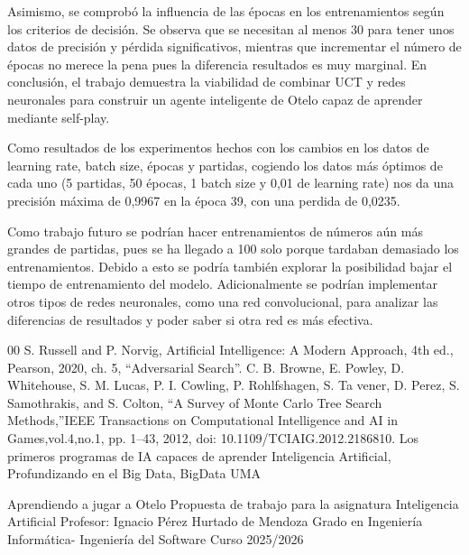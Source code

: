 \documentclass[conference,a4paper]{IEEEtran}
\begin{document}
Asimismo, se comprobó la influencia de las épocas en los entrenamientos según los criterios de decisión. Se observa que se necesitan al menos 30 para tener unos datos de precisión y pérdida significativos, mientras que incrementar el número de épocas no merece la pena pues la diferencia resultados es muy marginal. En conclusión, el trabajo demuestra la viabilidad de combinar UCT y redes neuronales para construir un agente inteligente de Otelo capaz de aprender mediante self-play.

Como resultados de los experimentos hechos con los cambios en los datos de learning rate, batch size, épocas y partidas, cogiendo los datos más óptimos de cada uno (5 partidas, 50 épocas, 1 batch size y 0,01 de learning rate) nos da una precisión máxima de 0,9967 en la época 39, con una perdida de 0,0235. 

Como trabajo futuro se podrían hacer entrenamientos de números aún más grandes de partidas, pues se ha llegado a 100 solo porque tardaban demasiado los entrenamientos. Debido a esto se podría también explorar la posibilidad bajar el tiempo de entrenamiento del modelo.
Adicionalmente se podrían implementar otros tipos de redes neuronales, como una red convolucional, para analizar las diferencias de resultados y poder saber si otra red es más efectiva.

\begin{thebibliography}{00}
 S. Russell and P. Norvig, Artificial Intelligence: A Modern Approach, 4th ed., Pearson,
2020, ch. 5, “Adversarial Search”.
  C. B. Browne, E. Powley, D. Whitehouse, S. M. Lucas, P. I. Cowling, P. Rohlfshagen, S. Ta
vener, D. Perez, S. Samothrakis, and S. Colton, “A Survey of Monte Carlo Tree Search
Methods,”IEEE Transactions on Computational Intelligence and AI in Games,vol.4,no.1,
pp. 1–43, 2012, doi: 10.1109/TCIAIG.2012.2186810.
 Los primeros programas de IA capaces de aprender
Inteligencia Artificial, Profundizando en el Big Data, BigData UMA

 Aprendiendo a jugar a Otelo
Propuesta de trabajo para la asignatura Inteligencia Artificial
Profesor: Ignacio Pérez Hurtado de Mendoza
Grado en Ingeniería Informática- Ingeniería del Software
Curso 2025/2026

\end{thebibliography}
\end{document}
